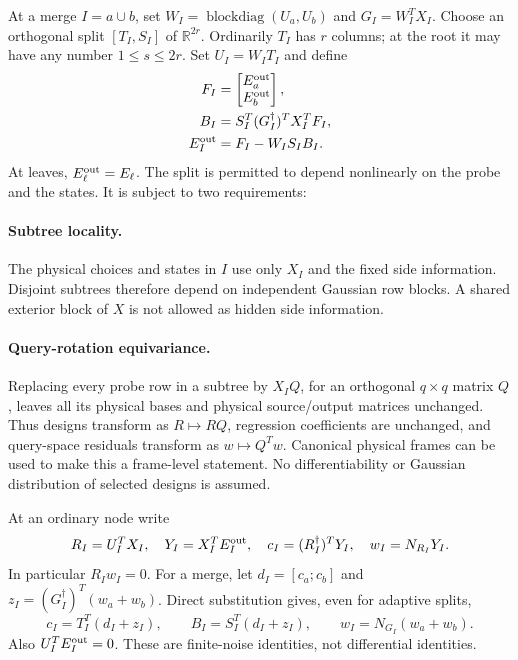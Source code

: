 \documentclass[11pt,oneside,openany,a4paper]{book}
\numberwithin{equation}{chapter}
\theoremstyle{definition}
\theoremstyle{remark}
\newcommand{\R}{\mathbb R}\newcommand{\E}{\mathbb E}\newcommand{\Prb}{\mathbb P}\newcommand{\PP}{\mathbb P}
\DeclareMathOperator{\diag}{blockdiag}\DeclareMathOperator{\range}{range}
\begin{document}
At a merge $I=a\cup b$, set $W_I=\diag(U_a,U_b)$ and $G_I=W_I^TX_I$. Choose an orthogonal split $[T_I,S_I]$ of $\R^{2r}$. Ordinarily $T_I$ has $r$ columns; at the root it may have any number $1\le s\le2r$. Set $U_I=W_IT_I$ and define
\begin{equation}\label{nonlinear:eq:physicalrec}
 \begin{split}
 F_I&=\begin{bmatrix}E_a^{\rm out}\\E_b^{\rm out}\end{bmatrix},\\
 B_I&=S_I^T(G_I^\dagger)^TX_I^TF_I,\\
 E_I^{\rm out}&=F_I-W_IS_IB_I.
 \end{split}
\end{equation}
At leaves, $E_\ell^{\rm out}=E_\ell$. The split is permitted to depend nonlinearly on the probe and the states. It is subject to two requirements:

\paragraph{Subtree locality.}
The physical choices and states in $I$ use only $X_I$ and the fixed side information. Disjoint subtrees therefore depend on independent Gaussian row blocks. A shared exterior block of $X$ is not allowed as hidden side information.

\paragraph{Query-rotation equivariance.}
Replacing every probe row in a subtree by $X_IQ$, for an orthogonal $q\times q$ matrix $Q$, leaves all its physical bases and physical source/output matrices unchanged. Thus designs transform as $R\mapsto RQ$, regression coefficients are unchanged, and query-space residuals transform as $w\mapsto Q^Tw$. Canonical physical frames can be used to make this a frame-level statement. No differentiability or Gaussian distribution of selected designs is assumed.

At an ordinary node write
\begin{equation}\label{nonlinear:eq:states}
 R_I=U_I^TX_I,\quad Y_I=X_I^TE_I^{\rm out},\quad
 c_I=(R_I^\dagger)^TY_I,\quad w_I=N_{R_I}Y_I.
\end{equation}
In particular $R_Iw_I=0$. For a merge, let $d_I=[c_a;c_b]$ and
$z_I=(G_I^\dagger)^T(w_a+w_b)$. Direct substitution gives, even for adaptive splits,
\begin{equation}\label{nonlinear:eq:register}
 \boxed{c_I=T_I^T(d_I+z_I),\qquad
 B_I=S_I^T(d_I+z_I),\qquad
 w_I=N_{G_I}(w_a+w_b).}
\end{equation}
Also $U_I^TE_I^{\rm out}=0$. These are finite-noise identities, not differential identities.
\end{document}
